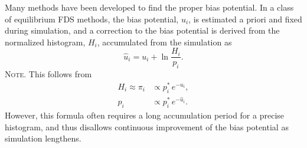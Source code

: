 \documentclass[reprint, superscriptaddress, floatfix]{revtex4-1}
\newcommand{\note}[1]{{\color{DarkGreen}\footnotesize \textsc{Note.} #1}}
\begin{document}
Many methods\cite{mezei1987, berg1992, *lee1993,
wang2001, *wang2001pre, huber1994,
*laio2002, *laio2008, *barducci2011, *sutto2012}
have been developed to find the proper bias potential.
%
In a class of equilibrium FDS methods\cite{
  mezei1987, berg1992, *lee1993, marinari1992, *lyubartsev1992},
the bias potential, $u_i$, is
estimated a priori and fixed
during simulation,
%
and a correction to the bias potential
is derived from the normalized histogram, $H_i$,
accumulated from the simulation as
%
%
\begin{equation}
  \hat u_i
  =
  u_i
  +
  \ln \frac{ H_i }
           { p_i }.
  \label{eq:vcorr_equil}
\end{equation}
%
\note{This follows from
  $$
  \begin{aligned}
    H_i \approx \pi_i
    &\propto p^*_i \, e^{-u_i},
    \\
    p_i
    &\propto p^*_i \, e^{-\hat u_i}.
  \end{aligned}
  $$
}
However, this formula often requires a long
accumulation period for a precise histogram,
and thus disallows
continuous improvement of the bias potential
as simulation lengthens.
\end{document}
